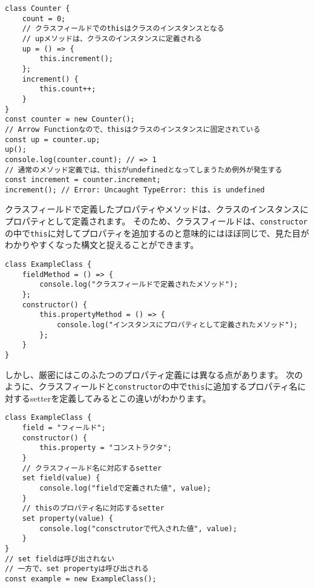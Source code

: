 \begin{lstlisting}
class Counter {
    count = 0;
    // クラスフィールドでのthisはクラスのインスタンスとなる
    // upメソッドは、クラスのインスタンスに定義される
    up = () => {
        this.increment();
    };
    increment() {
        this.count++;
    }
}
const counter = new Counter();
// Arrow Functionなので、thisはクラスのインスタンスに固定されている
const up = counter.up;
up();
console.log(counter.count); // => 1
// 通常のメソッド定義では、thisがundefinedとなってしまうため例外が発生する
const increment = counter.increment;
increment(); // Error: Uncaught TypeError: this is undefined
\end{lstlisting}

\begin{tcolorbox}[enhanced jigsaw,breakable,title=クラスフィールドとインスタンスのプロパティの違い]\label{difference-between-class-fields-and-instance-property}

クラスフィールドで定義したプロパティやメソッドは、クラスのインスタンスにプロパティとして定義されます。
そのため、クラスフィールドは、\texttt{constructor}の中で\texttt{this}に対してプロパティを追加するのと意味的にはほぼ同じで、見た目がわかりやすくなった構文と捉えることができます。

\begin{lstlisting}
class ExampleClass {
    fieldMethod = () => {
        console.log("クラスフィールドで定義されたメソッド");
    };
    constructor() {
        this.propertyMethod = () => {
            console.log("インスタンスにプロパティとして定義されたメソッド");
        };
    }
}
\end{lstlisting}

しかし、厳密にはこのふたつのプロパティ定義には異なる点があります。
次のように、クラスフィールドと\texttt{constructor}の中で\texttt{this}に追加するプロパティ名に対するsetterを定義してみるとこの違いがわかります。

\begin{lstlisting}
class ExampleClass {
    field = "フィールド";
    constructor() {
        this.property = "コンストラクタ";
    }
    // クラスフィールド名に対応するsetter
    set field(value) {
        console.log("fieldで定義された値", value);
    }
    // thisのプロパティ名に対応するsetter
    set property(value) {
        console.log("consctrutorで代入された値", value);
    }
}
// set fieldは呼び出されない
// 一方で、set propertyは呼び出される
const example = new ExampleClass();
\end{lstlisting}


\end{tcolorbox}
